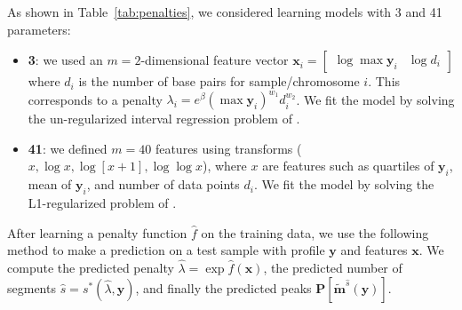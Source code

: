 \documentclass{article}
\begin{document}
As shown in Table~\ref{tab:penalties}, we considered learning models
with 3 and 41 parameters:

\begin{itemize}
\item \textbf{3}: we used an $m=2$-dimensional feature
  vector $\mathbf x_i = \left[\begin{array}{cc} \log\max \mathbf y_i &
      \log d_i
\end{array}\right]$ where $d_i$ is the number of base pairs for 
sample/chromosome $i$.  This corresponds to a penalty $\lambda_i =
e^\beta (\max\mathbf y_i)^{w_1} d_i^{w_2}$. We fit the model by
solving the un-regularized interval regression problem of
\citet{HOCKING-penalties}.
\item \textbf{41}: we defined $m=40$ features using transforms ($x,
  \log x, \log[x+1], \log\log x$), where $x$ are features such as
  quartiles of $\mathbf y_i$, mean of $\mathbf y_i$, and
  number of data points $d_i$. We fit the model by solving
  the L1-regularized problem of
  \citet{HOCKING-penalties}.
\end{itemize}

After learning a penalty function $\hat f$ on the training data, we
use the following method to make a prediction on a test sample with
profile $\mathbf y$ and features $\mathbf x$. We compute the predicted
penalty $\hat \lambda = \exp \hat f(\mathbf x)$, the predicted number
of segments $\hat s = s^*(\hat \lambda, \mathbf y)$, and finally the
predicted peaks $\mathbf P\left[ \mathbf{\tilde m}^{\hat s}(\mathbf y)
\right]$.
\end{document}
